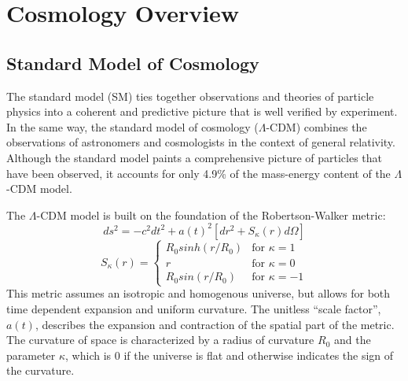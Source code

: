 




\chapter{Cosmology Overview}
\section{Standard Model of Cosmology}
The standard model (SM) ties together observations and theories of particle physics into a coherent and predictive picture that is well verified by experiment. In the same way, the standard model of cosmology ($\Lambda$-CDM) combines the observations of astronomers and cosmologists in the context of general relativity. Although the standard model paints a comprehensive picture of particles that have been observed, it accounts for only 4.9\%\cite{planck2015} of the mass-energy content of the $\Lambda$-CDM model. 

The $\Lambda$-CDM model is built on the foundation of the Robertson-Walker metric:
\begin{equation} \label{eq:rwmetric}
ds^2 = -c^2dt^2+a(t)^2 \left[ dr^2 +S_{\kappa}(r)d\Omega \right]
\end{equation}
\begin{equation}\label{eq:rwcurvature}
S_{\kappa}(r)=
\begin{cases}
R_0sinh(r/R_0) & \text{for } \kappa = 1 \\
r                        & \text{for } \kappa = 0 \\
R_0sin(r/R_0)   & \text{for } \kappa = -1
\end{cases}
\end{equation}
This metric assumes an isotropic and homogenous universe, but allows for both time dependent expansion and uniform curvature. The unitless ``scale factor'', $a(t)$, describes the expansion and contraction of the spatial part of the metric. The curvature of space is characterized by a radius of curvature $R_0$ and the parameter $\kappa$, which is 0 if the universe is flat and otherwise indicates the sign of the curvature.

